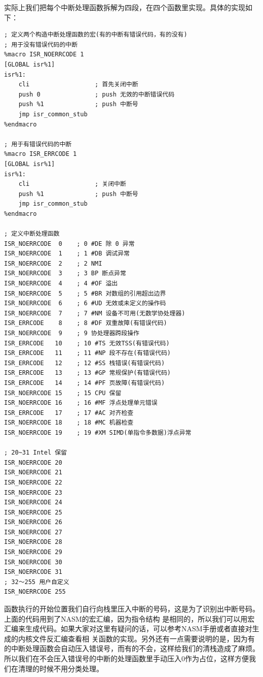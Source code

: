 \par 实际上我们把每个中断处理函数拆解为四段，在四个函数里实现。具体的实现如下：

\begin{lstlisting}[language = {[x86masm]Assembler}, caption = gdt/gdt\_s.s]
; 定义两个构造中断处理函数的宏(有的中断有错误代码，有的没有)
; 用于没有错误代码的中断
%macro ISR_NOERRCODE 1
[GLOBAL isr%1]
isr%1:
	cli                  ; 首先关闭中断
	push 0               ; push 无效的中断错误代码
	push %1              ; push 中断号
	jmp isr_common_stub
%endmacro

; 用于有错误代码的中断
%macro ISR_ERRCODE 1
[GLOBAL isr%1]
isr%1:
	cli                  ; 关闭中断
	push %1              ; push 中断号
	jmp isr_common_stub
%endmacro

; 定义中断处理函数
ISR_NOERRCODE  0 	; 0 #DE 除 0 异常
ISR_NOERRCODE  1 	; 1 #DB 调试异常
ISR_NOERRCODE  2 	; 2 NMI
ISR_NOERRCODE  3 	; 3 BP 断点异常 
ISR_NOERRCODE  4 	; 4 #OF 溢出 
ISR_NOERRCODE  5 	; 5 #BR 对数组的引用超出边界 
ISR_NOERRCODE  6 	; 6 #UD 无效或未定义的操作码 
ISR_NOERRCODE  7 	; 7 #NM 设备不可用(无数学协处理器) 
ISR_ERRCODE    8 	; 8 #DF 双重故障(有错误代码) 
ISR_NOERRCODE  9 	; 9 协处理器跨段操作
ISR_ERRCODE   10 	; 10 #TS 无效TSS(有错误代码) 
ISR_ERRCODE   11 	; 11 #NP 段不存在(有错误代码) 
ISR_ERRCODE   12 	; 12 #SS 栈错误(有错误代码) 
ISR_ERRCODE   13 	; 13 #GP 常规保护(有错误代码) 
ISR_ERRCODE   14 	; 14 #PF 页故障(有错误代码) 
ISR_NOERRCODE 15 	; 15 CPU 保留 
ISR_NOERRCODE 16 	; 16 #MF 浮点处理单元错误 
ISR_ERRCODE   17 	; 17 #AC 对齐检查 
ISR_NOERRCODE 18 	; 18 #MC 机器检查 
ISR_NOERRCODE 19 	; 19 #XM SIMD(单指令多数据)浮点异常

; 20~31 Intel 保留
ISR_NOERRCODE 20
ISR_NOERRCODE 21
ISR_NOERRCODE 22
ISR_NOERRCODE 23
ISR_NOERRCODE 24
ISR_NOERRCODE 25
ISR_NOERRCODE 26
ISR_NOERRCODE 27
ISR_NOERRCODE 28
ISR_NOERRCODE 29
ISR_NOERRCODE 30
ISR_NOERRCODE 31
; 32～255 用户自定义
ISR_NOERRCODE 255
\end{lstlisting}

\par 函数执行的开始位置我们自行向栈里压入中断的号码，这是为了识别出中断号码。上面的代码用到了NASM的宏汇编，因为指令结构\allowbreak
是相同的，所以我们可以用宏汇编来生成代码。如果大家对这里有疑问的话，可以参考NASM手册或者直接对生成的内核文件反汇编查看相\allowbreak
关函数的实现。另外还有一点需要说明的是，因为有的中断处理函数会自动压入错误号，而有的不会，这样给我们的清栈造成了麻烦。\allowbreak
所以我们在不会压入错误号的中断的处理函数里手动压入0作为占位，这样方便我们在清理的时候不用分类处理。

